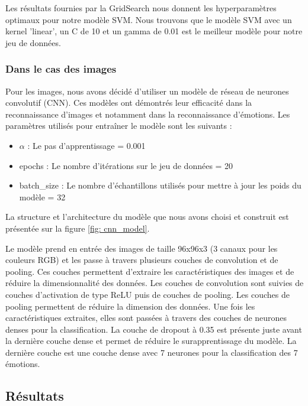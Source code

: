 \documentclass{rapport}
\begin{document}
Les résultats fournies par la GridSearch nous donnent les hyperparamètres optimaux pour notre modèle SVM. Nous trouvons
que le modèle SVM avec un kernel 'linear', un C de 10 et un gamma de 0.01 est le meilleur modèle pour notre jeu de données.

\subsubsection{Dans le cas des images}
Pour les images, nous avons décidé d'utiliser un modèle de réseau de neurones convolutif (CNN). Ces modèles ont démontrés
leur efficacité dans la reconnaissance d'images et notamment dans la reconnaissance d'émotions. Les paramètres utilisés pour
entraîner le modèle sont les suivants :

\begin{itemize}
    \item $\alpha$ : Le pas d'apprentissage = 0.001
    \item epochs : Le nombre d'itérations sur le jeu de données = 20
    \item batch\_size : Le nombre d'échantillons utilisés pour mettre à jour les poids du modèle = 32\\
\end{itemize}

La structure et l'architecture du modèle que nous avons choisi et construit est présentée sur la figure \ref*{fig: cnn_model}.\\


Le modèle prend en entrée des images de taille 96x96x3 (3 canaux pour les couleurs RGB) et les passe à travers plusieurs couches de convolution
et de pooling. Ces couches permettent d'extraire les caractéristiques des images et de réduire la dimensionnalité des données. Les couches
de convolution sont suivies de couches d'activation de type ReLU puis de couches de pooling. Les couches de pooling permettent de réduire la
dimension des données. Une fois les caractéristiques extraites, elles sont passées à travers des couches de neurones denses pour la classification.
La couche de dropout à 0.35 est présente juste avant la dernière couche dense et permet de réduire le surapprentissage du modèle. La dernière couche
est une couche dense avec 7 neurones pour la classification des 7 émotions.\\


\subsection{Résultats}
\end{document}
